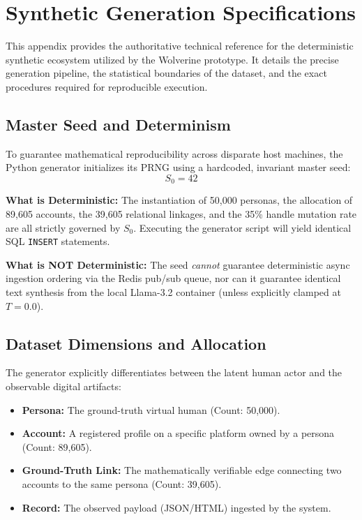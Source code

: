 \chapter{Synthetic Generation Specifications}
\label{app:synthetic-generator}

This appendix provides the authoritative technical reference for the deterministic synthetic ecosystem utilized by the Wolverine prototype. It details the precise generation pipeline, the statistical boundaries of the dataset, and the exact procedures required for reproducible execution.

\section{Master Seed and Determinism}
\label{app-sec:seed-determinism}
To guarantee mathematical reproducibility across disparate host machines, the Python generator initializes its PRNG using a hardcoded, invariant master seed:
\begin{equation}
    S_0 = 42
\end{equation}

\textbf{What is Deterministic:} The instantiation of 50,000 personas, the allocation of 89,605 accounts, the 39,605 relational linkages, and the 35\% handle mutation rate are all strictly governed by $S_0$. Executing the generator script will yield identical SQL \texttt{INSERT} statements.

\textbf{What is NOT Deterministic:} The seed \textit{cannot} guarantee deterministic async ingestion ordering via the Redis pub/sub queue, nor can it guarantee identical text synthesis from the local Llama-3.2 container (unless explicitly clamped at $T=0.0$). 

\section{Dataset Dimensions and Allocation}
\label{app-sec:dataset-dimensions}
The generator explicitly differentiates between the latent human actor and the observable digital artifacts:
\begin{itemize}
    \item \textbf{Persona:} The ground-truth virtual human (Count: 50,000).
    \item \textbf{Account:} A registered profile on a specific platform owned by a persona (Count: 89,605).
    \item \textbf{Ground-Truth Link:} The mathematically verifiable edge connecting two accounts to the same persona (Count: 39,605).
    \item \textbf{Record:} The observed payload (JSON/HTML) ingested by the system.
\end{itemize}

